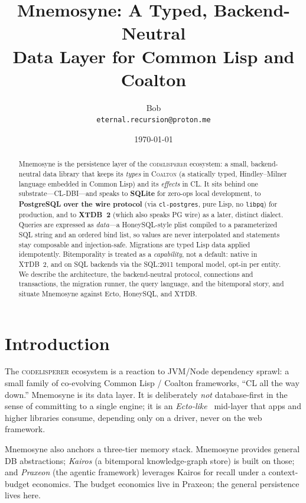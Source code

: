 \documentclass[11pt,a4paper]{article}
\title{\textbf{Mnemosyne}: A Typed, Backend-Neutral\\ Data Layer for Common Lisp and Coalton}
\author{Bob\\ \small\texttt{eternal.recursion@proton.me}}
\date{\today}
\begin{document}
\maketitle

\begin{abstract}
Mnemosyne is the persistence layer of the \textsc{codelisperer} ecosystem: a small,
backend-neutral data library that keeps its \emph{types} in \textsc{Coalton} (a
statically typed, Hindley--Milner language embedded in Common Lisp) and its \emph{effects}
in CL. It sits behind one substrate---\textsc{CL-DBI}---and speaks to \textbf{SQLite} for
zero-ops local development, to \textbf{PostgreSQL over the wire protocol} (via
\texttt{cl-postgres}, pure Lisp, no \texttt{libpq}) for production, and to \textbf{XTDB~2}
(which also speaks PG wire) as a later, distinct dialect. Queries are expressed as
\emph{data}---a HoneySQL-style plist compiled to a parameterized SQL string and an ordered
bind list, so values are never interpolated and statements stay composable and
injection-safe. Migrations are typed Lisp data applied idempotently. Bitemporality is
treated as a \emph{capability}, not a default: native in XTDB~2, and on SQL backends via
the SQL:2011 temporal model, opt-in per entity. We describe the architecture, the
backend-neutral protocol, connections and transactions, the migration runner, the query
language, and the bitemporal story, and situate Mnemosyne against Ecto, HoneySQL, and XTDB.
\end{abstract}

\section{Introduction}
\label{sec:intro}
The \textsc{codelisperer} ecosystem is a reaction to JVM/Node dependency sprawl: a small
family of co-evolving Common Lisp / Coalton frameworks, ``CL all the way down.'' Mnemosyne
is its data layer. It is deliberately \emph{not} database-first in the sense of committing
to a single engine; it is an \emph{Ecto-like}~\citep{ecto} mid-layer that apps and higher
libraries consume, depending only on a driver, never on the web framework.

Mnemosyne also anchors a three-tier memory stack. Mnemosyne provides general DB
abstractions; \emph{Kairos} (a bitemporal knowledge-graph store) is built on those; and
\emph{Praxeon} (the agentic framework) leverages Kairos for recall under a context-budget
economics. The budget economics live in Praxeon; the general persistence lives here.
\end{document}
